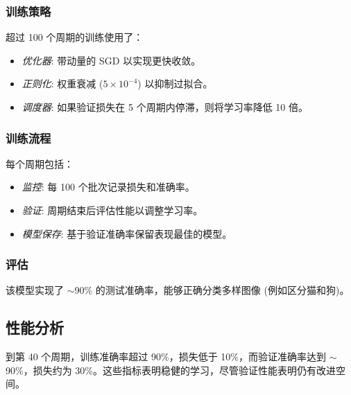 \documentclass[UTF8]{report}
\theoremstyle{MyLineTheoremStyle} %
\theoremstyle{MyBlockTheoremStyle} %
\theoremstyle{MySubsubsectionStyle} %
\begin{document}
\subsubsection{训练策略}

超过 100 个周期的训练使用了：

\begin{itemize}
    \item \textit{优化器}: 带动量的 SGD 以实现更快收敛。
    \item \textit{正则化}: 权重衰减 ($5 \times 10^{-4}$) 以抑制过拟合。
    \item \textit{调度器}: 如果验证损失在 5 个周期内停滞，则将学习率降低 10 倍。
\end{itemize}

\subsubsection{训练流程}

每个周期包括：

\begin{itemize}
    \item \textit{监控}: 每 100 个批次记录损失和准确率。
    \item \textit{验证}: 周期结束后评估性能以调整学习率。
    \item \textit{模型保存}: 基于验证准确率保留表现最佳的模型。
\end{itemize}

\subsubsection{评估}

该模型实现了 $\sim$90\% 的测试准确率，能够正确分类多样图像 (例如区分猫和狗)。

\subsection{性能分析}

到第 40 个周期，训练准确率超过 90\%，损失低于 10\%，而验证准确率达到 $\sim$90\%，损失约为 30\%。这些指标表明稳健的学习，尽管验证性能表明仍有改进空间。

\end{document}
